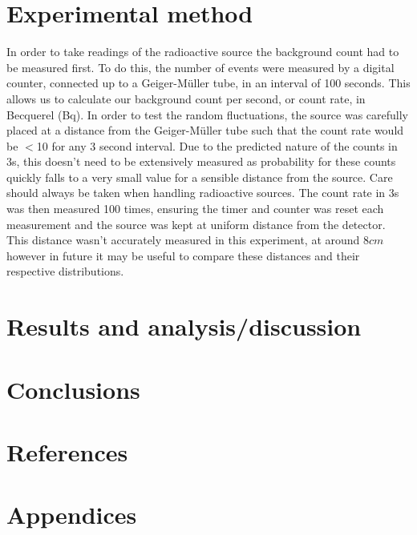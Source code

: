 \documentclass[11pt]{article}
\begin{document}
    \section{Experimental method}
    In order to take readings of the radioactive source the background count had to be measured first. To do this, the number of events were measured by a digital counter, connected  up to a Geiger-Müller tube, in an interval of 100 seconds. This allows us to calculate our background count per second, or count rate, in Becquerel (Bq). 
    \newline
    In order to test the random fluctuations, the  source was carefully placed at a distance from the Geiger-Müller tube such that the count rate would be $<$10 for any 3 second interval. Due to the predicted nature of the counts in 3s, this doesn't need to be extensively measured as probability for these counts quickly falls to a very small value for a sensible distance from the source. Care should always be taken when handling radioactive sources. 
    \newline
    The count rate in 3s was then measured 100 times, ensuring the timer and counter was reset each measurement and the source was kept at uniform distance from the detector. This distance wasn't accurately measured in this experiment, at around $8 cm$ however in future it may be useful to compare these distances and their respective distributions. 
    \newline 
    
    \section{Results and analysis/discussion}
    
    \section{Conclusions}
    \section{References}
    \section{Appendices}
    
     
\end{document}
